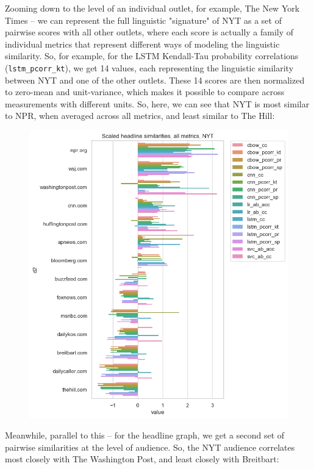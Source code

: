 \documentclass{scrartcl}
\begin{document}
Zooming down to the level of an individual outlet, for example, The New York Times -- we can represent the full linguistic "signature" of NYT as a set of pairwise scores with all other outlets, where each score is actually a family of individual metrics that represent different ways of modeling the linguistic similarity. So, for example, for the LSTM Kendall-Tau probability correlations (\texttt{lstm\_pcorr\_kt}), we get 14 values, each representing the linguistic similarity between NYT and one of the other outlets. These 14 scores are then normalized to zero-mean and unit-variance, which makes it possible to compare across measurements with different units. So, here, we can see that NYT is most similar to NPR, when averaged across all metrics, and least similar to The Hill:

\begin{figure}[H]
  \centering
  \includegraphics[height=0.5\textheight]{figures/ca-nyt-content.png}
\end{figure}

Meanwhile, parallel to this -- for the headline graph, we get a second set of pairwise similarities at the level of audience. So, the NYT audience correlates most closely with The Washington Post, and least closely with Breitbart:
\end{document}
